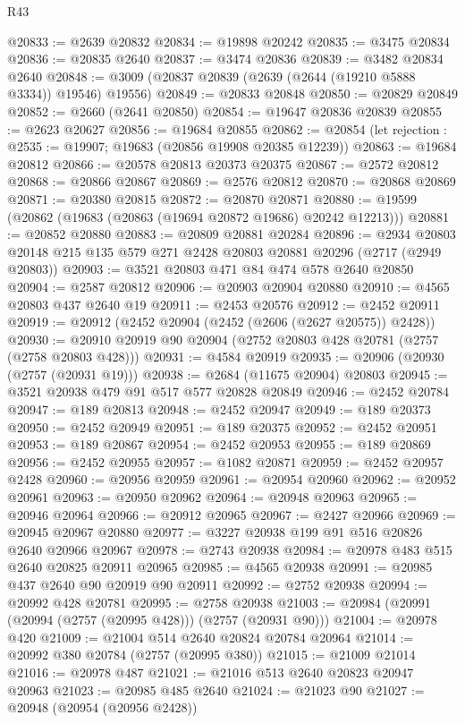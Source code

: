 \begin{lexlean}{R43}
\begin{coremodule}
@20833 := @2639 @20832
@20834 := @19898 @20242
@20835 := @3475 @20834
@20836 := @20835 @2640
@20837 := @3474 @20836
@20839 := @3482 @20834 @2640
@20848 := @3009 (@20837 @20839 (@2639 (@2644 (@19210 @5888 @3334)) @19546) @19556)
@20849 := @20833 @20848
@20850 := @20829 @20849
@20852 := @2660 (@2641 @20850)
@20854 := @19647 @20836 @20839
@20855 := @2623 @20627
@20856 := @19684 @20855
@20862 := @20854 (let rejection : @2535 := @19907; @19683 (@20856 @19908 @20385 @12239))
@20863 := @19684 @20812
@20866 := @20578 @20813 @20373 @20375
@20867 := @2572 @20812
@20868 := @20866 @20867
@20869 := @2576 @20812
@20870 := @20868 @20869
@20871 := @20380 @20815
@20872 := @20870 @20871
@20880 := @19599 (@20862 (@19683 (@20863 (@19694 @20872 @19686) @20242 @12213)))
@20881 := @20852 @20880
@20883 := @20809 @20881 @20284
@20896 := @2934 @20803 @20148 @215 @135 @579 @271 @2428 @20803 @20881 @20296 (@2717 (@2949 @20803))
@20903 := @3521 @20803 @471 @84 @474 @578 @2640 @20850
@20904 := @2587 @20812
@20906 := @20903 @20904 @20880
@20910 := @4565 @20803 @437 @2640 @19
@20911 := @2453 @20576
@20912 := @2452 @20911
@20919 := @20912 (@2452 @20904 (@2452 (@2606 (@2627 @20575)) @2428))
@20930 := @20910 @20919 @90 @20904 (@2752 @20803 @428 @20781 (@2757 (@2758 @20803 @428)))
@20931 := @4584 @20919
@20935 := @20906 (@20930 (@2757 (@20931 @19)))
@20938 := @2684 (@11675 @20904) @20803
@20945 := @3521 @20938 @479 @91 @517 @577 @20828 @20849
@20946 := @2452 @20784
@20947 := @189 @20813
@20948 := @2452 @20947
@20949 := @189 @20373
@20950 := @2452 @20949
@20951 := @189 @20375
@20952 := @2452 @20951
@20953 := @189 @20867
@20954 := @2452 @20953
@20955 := @189 @20869
@20956 := @2452 @20955
@20957 := @1082 @20871
@20959 := @2452 @20957 @2428
@20960 := @20956 @20959
@20961 := @20954 @20960
@20962 := @20952 @20961
@20963 := @20950 @20962
@20964 := @20948 @20963
@20965 := @20946 @20964
@20966 := @20912 @20965
@20967 := @2427 @20966
@20969 := @20945 @20967 @20880
@20977 := @3227 @20938 @199 @91 @516 @20826 @2640 @20966 @20967
@20978 := @2743 @20938
@20984 := @20978 @483 @515 @2640 @20825 @20911 @20965
@20985 := @4565 @20938
@20991 := @20985 @437 @2640 @90 @20919 @90 @20911
@20992 := @2752 @20938
@20994 := @20992 @428 @20781
@20995 := @2758 @20938
@21003 := @20984 (@20991 (@20994 (@2757 (@20995 @428))) (@2757 (@20931 @90)))
@21004 := @20978 @420
@21009 := @21004 @514 @2640 @20824 @20784 @20964
@21014 := @20992 @380 @20784 (@2757 (@20995 @380))
@21015 := @21009 @21014
@21016 := @20978 @487
@21021 := @21016 @513 @2640 @20823 @20947 @20963
@21023 := @20985 @485 @2640
@21024 := @21023 @90
@21027 := @20948 (@20954 (@20956 @2428))

\end{coremodule}
\end{lexlean}
